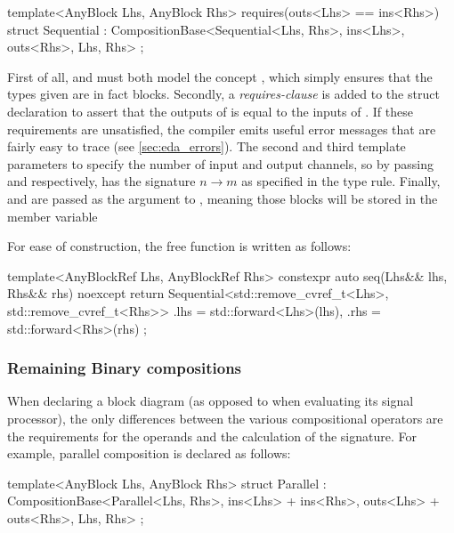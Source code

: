 \begin{cppcodenl}
  template<AnyBlock Lhs, AnyBlock Rhs>
  requires(outs<Lhs> == ins<Rhs>)
  struct Sequential : CompositionBase<Sequential<Lhs, Rhs>, ins<Lhs>, outs<Rhs>, Lhs, Rhs> {};
\end{cppcodenl}

First of all,  and  must both model the concept , which simply
ensures that the types given are in fact blocks. Secondly, a \emph{requires-clause} is added to the struct
declaration to assert that the outputs of  is equal to the inputs of . If these requirements are unsatisfied,
the compiler emits useful error messages that are fairly easy to trace (see \autoref{sec:eda_errors}). The
second and third template parameters to  specify the number of input and output
channels, so by passing  and  respectively,
 has the signature $n \rightarrow m$ as specified in the type rule. Finally,  and
 are passed as the  argument to , meaning those blocks will be stored
in the  member variable

For ease of construction, the free function  is written as follows:

\begin{cppcodenl}
  template<AnyBlockRef Lhs, AnyBlockRef Rhs>
  constexpr auto seq(Lhs&& lhs, Rhs&& rhs) noexcept
  {
    return Sequential<std::remove_cvref_t<Lhs>, std::remove_cvref_t<Rhs>>{
      .lhs = std::forward<Lhs>(lhs),
      .rhs = std::forward<Rhs>(rhs)
    };
  }
\end{cppcodenl}

\subsubsection{Remaining Binary compositions}

When declaring a block diagram (as opposed to when evaluating its signal processor), the only differences
between the various compositional operators are the requirements for the operands and the calculation of the
signature. For example, parallel composition is declared as follows:

\begin{cppcodenl}
  template<AnyBlock Lhs, AnyBlock Rhs>
  struct Parallel : CompositionBase<Parallel<Lhs, Rhs>, ins<Lhs> + ins<Rhs>, outs<Lhs> + outs<Rhs>, Lhs, Rhs> {};
\end{cppcodenl}

